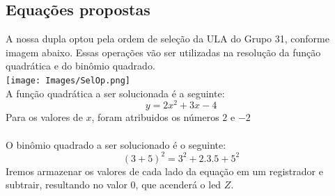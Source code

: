 \documentclass[]{article}
\begin{document}
	\subsection{Equações propostas}
		A nossa dupla optou pela ordem de seleção da ULA do Grupo 31, conforme imagem abaixo. Essas operações vão ser utilizadas na resolução da função quadrática e do binômio quadrado.\\
		\texttt{[image: Images/SelOp.png]}\\
		
		A função quadrática a ser solucionada é a seguinte: $$y = 2x^2+3x-4$$
		Para os valores de $x$, foram atribuidos os números $2$ e $-2$\\
		\\
		O binômio quadrado a ser solucionado é o seguinte: $$(3+5)^2 = 3^2 +2.3.5 +5^2$$
		Iremos armazenar os valores de cada lado da equação em um registrador e subtrair, resultando no valor 0, que acenderá o led $Z$.
		
\end{document}
